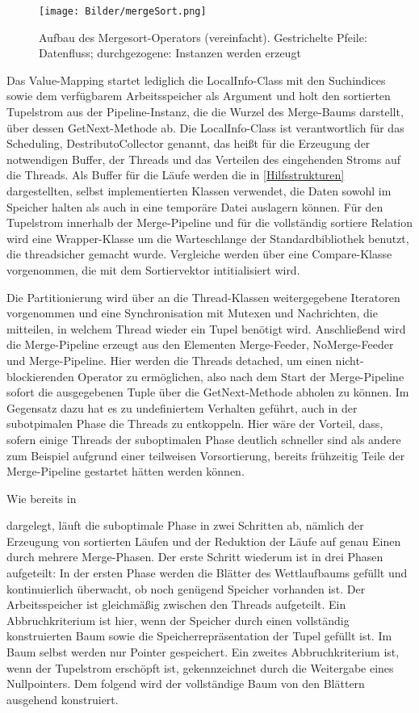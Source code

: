 \documentclass[a4paper,12pt,twoside]{article}
\begin{document}
\begin{figure}
	\centering
	\texttt{[image: Bilder/mergeSort.png]}
	\caption{Aufbau des Mergesort-Operators (vereinfacht). Gestrichelte Pfeile: Datenfluss; durchgezogene: Instanzen werden erzeugt}
	\label{img:KlassSort}
\end{figure}


Das Value-Mapping startet lediglich die LocalInfo-Class mit den Suchindices sowie dem verfügbarem Arbeitsspeicher als Argument und holt den sortierten Tupelstrom aus der Pipeline-Instanz, die die Wurzel des Merge-Baums darstellt, über dessen GetNext-Methode ab. Die LocalInfo-Class ist verantwortlich für das Scheduling, DestributoCollector genannt, das heißt für die Erzeugung der notwendigen Buffer, der Threads und das Verteilen des eingehenden Stroms auf die Threads. Als Buffer für die Läufe werden die in \autoref{Hilfsstrukturen} dargestellten, selbst implementierten Klassen verwendet, die Daten sowohl im Speicher halten als auch in eine temporäre Datei auslagern können. Für den Tupelstrom innerhalb der Merge-Pipeline und für die vollständig sortiere Relation wird eine Wrapper-Klasse um die Warteschlange der Standardbibliothek benutzt, die threadsicher gemacht wurde. Vergleiche werden über eine Compare-Klasse vorgenommen, die mit dem Sortiervektor intitialisiert wird.

Die Partitionierung wird über an die Thread-Klassen weitergegebene Iteratoren vorgenommen und eine Synchronisation mit Mutexen und Nachrichten, die mitteilen, in welchem Thread wieder ein Tupel benötigt wird. Anschließend wird die Merge-Pipeline erzeugt aus den Elementen Merge-Feeder, NoMerge-Feeder und Merge-Pipeline. Hier werden die Threads detached, um einen nicht-blockierenden Operator zu ermöglichen, also nach dem Start der Merge-Pipeline sofort die ausgegebenen Tuple über die GetNext-Methode abholen zu können. Im Gegensatz dazu hat es zu undefiniertem Verhalten geführt, auch in der subotpimalen Phase die Threads zu entkoppeln. Hier wäre der Vorteil, dass, sofern einige Threads der suboptimalen Phase deutlich schneller sind als andere zum Beispiel aufgrund einer teilweisen Vorsortierung, bereits frühzeitig Teile der Merge-Pipeline gestartet hätten werden können.

Wie bereits in \author{Entwicklung} dargelegt, läuft die suboptimale Phase in zwei Schritten ab, nämlich der Erzeugung von sortierten Läufen und der Reduktion der Läufe auf genau Einen durch mehrere Merge-Phasen. Der erste Schritt wiederum ist in drei Phasen aufgeteilt: In der ersten Phase werden die Blätter des Wettlaufbaums gefüllt und kontinuierlich überwacht, ob noch genügend Speicher vorhanden ist. Der Arbeitsspeicher ist gleichmäßig zwischen den Threads aufgeteilt. Ein Abbruchkriterium ist hier, wenn der Speicher durch einen vollständig konstruierten Baum sowie die Speicherrepräsentation der Tupel gefüllt ist. Im Baum selbst werden nur Pointer gespeichert. Ein zweites Abbruchkriterium ist, wenn der Tupelstrom erschöpft ist, gekennzeichnet durch die Weitergabe eines Nullpointers. Dem folgend wird der vollständige Baum von den Blättern ausgehend konstruiert.
\end{document}
